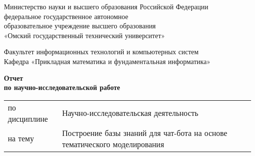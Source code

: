 \thispagestyle{empty}
\begin{center}
{\small Министерство науки и высшего образования Российской Федерации\\
федеральное государственное автономное\\
образовательное учреждение высшего образования\\
«Омский государственный технический университет»}
\end{center}

\vspace{0pt plus1fill}

\begin{center}
    Факультет информационных технологий и компьютерных систем\\
    Кафедра «Прикладная математика и фундаментальная информатика»
\end{center}

\vspace{0pt plus2fill}

\begin{center}
{\large \textbf{Отчет\\по научно-исследовательской работе}}
\end{center}

\vspace{0pt plus1fill}

\begin{flushleft}
    \begin{tabular}{@{}ll}
        по дисциплине & Научно-исследовательская деятельность \\[0.5cm]
        на тему & \parbox[t]{0.7\textwidth}{Построение базы знаний для чат-бота на основе тематического моделирования} \\
    \end{tabular}
\end{flushleft}

\vspace{0pt plus2fill}

